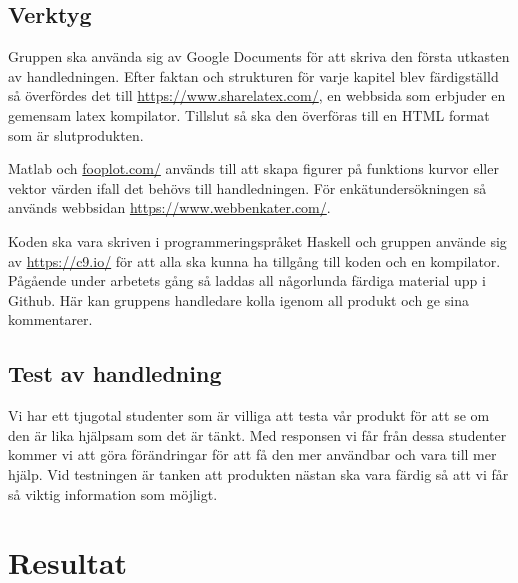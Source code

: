 \documentclass[]{article}
\begin{document}
\subsection{Verktyg}%
Gruppen ska använda sig av Google Documents för att skriva den första utkasten av handledningen.
Efter faktan och strukturen för varje kapitel blev färdigställd så överfördes det till 
\url{https://www.sharelatex.com/}, en webbsida som erbjuder en gemensam latex kompilator. 
Tillslut så ska den överföras till en HTML format som är slutprodukten. 

Matlab och \url{fooplot.com/} används till att skapa figurer på funktions kurvor eller vektor 
värden ifall det behövs till handledningen. För enkätundersökningen så används webbsidan 
\url{https://www.webbenkater.com/}.

Koden ska vara skriven i programmeringspråket Haskell och gruppen använde sig av \url{https://c9.io/} 
för att alla ska kunna ha tillgång till koden och en kompilator. 
Pågående under arbetets gång så laddas all någorlunda färdiga material upp i Github. 
Här kan gruppens handledare kolla igenom all produkt och ge sina kommentarer. 


\subsection{Test av handledning}

Vi har ett tjugotal studenter som är villiga att testa vår produkt för
att se om den är lika hjälpsam som det är tänkt. Med responsen vi får
från dessa studenter kommer vi att göra förändringar för att få den mer
användbar och vara till mer hjälp. Vid testningen är tanken att
produkten nästan ska vara färdig så att vi får så viktig information som
möjligt.

\section{Resultat}


%
\end{document}
